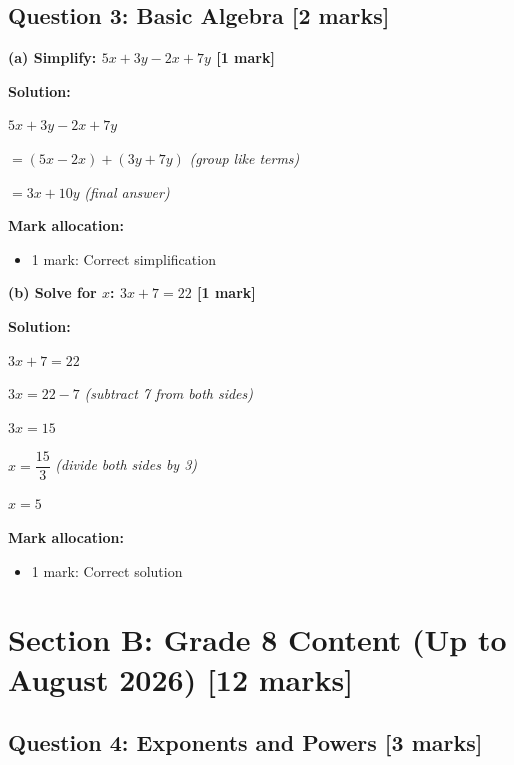 \documentclass[12pt,a4paper]{article}
\begin{document}
\subsection*{Question 3: Basic Algebra [2 marks]}

\textbf{(a) Simplify: $5x + 3y - 2x + 7y$ \hfill [1 mark]}

\vspace{0.2cm}
\noindent\textbf{Solution:}

$5x + 3y - 2x + 7y$

$= (5x - 2x) + (3y + 7y)$ \checkmark \quad \textit{(group like terms)}

$= 3x + 10y$ \checkmark \quad \textit{(final answer)}

\vspace{0.3cm}
\noindent\textbf{Mark allocation:}
\begin{itemize}
    \item 1 mark: Correct simplification
\end{itemize}

\vspace{0.4cm}

\textbf{(b) Solve for $x$: $3x + 7 = 22$ \hfill [1 mark]}

\vspace{0.2cm}
\noindent\textbf{Solution:}

$3x + 7 = 22$

$3x = 22 - 7$ \checkmark \quad \textit{(subtract 7 from both sides)}

$3x = 15$

$x = \dfrac{15}{3}$ \checkmark \quad \textit{(divide both sides by 3)}

$x = 5$

\vspace{0.3cm}
\noindent\textbf{Mark allocation:}
\begin{itemize}
    \item 1 mark: Correct solution
\end{itemize}

\newpage
\section*{Section B: Grade 8 Content (Up to August 2026) [12 marks]}

\subsection*{Question 4: Exponents and Powers [3 marks]}
\end{document}

